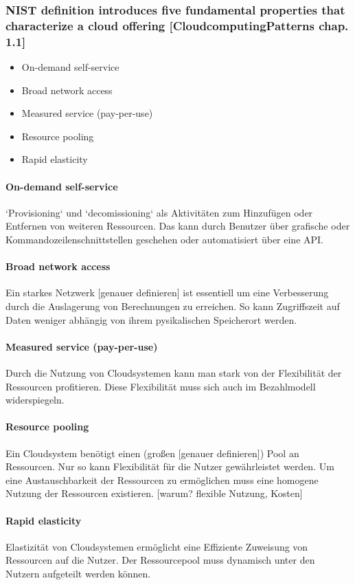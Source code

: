 \documentclass[a4paper,10pt]{article}
\begin{document}
\subsubsection{NIST definition introduces five fundamental properties that characterize a cloud offering [CloudcomputingPatterns chap. 1.1]}

\begin{itemize}
 \item On-demand self-service
 \item Broad network access
 \item Measured service (pay-per-use)
 \item Resource pooling
 \item Rapid elasticity
\end{itemize}

\paragraph{On-demand self-service}
`Provisioning` und `decomissioning` als Aktivitäten zum Hinzufügen oder Entfernen von weiteren Ressourcen.
Das kann durch Benutzer über grafische oder Kommandozeilenschnittstellen geschehen oder automatisiert über eine API.
\paragraph{Broad network access}
Ein starkes Netzwerk [genauer definieren] ist essentiell um eine Verbesserung durch die Auslagerung von Berechnungen zu erreichen. 
So kann Zugriffszeit auf Daten weniger abhängig von ihrem pysikalischen Speicherort werden.
\paragraph{Measured service (pay-per-use)}
Durch die Nutzung von Cloudsystemen kann man stark von der Flexibilität der Ressourcen profitieren.
Diese Flexibilität muss sich auch im Bezahlmodell widerspiegeln.
\paragraph{Resource pooling}
Ein Cloudsystem benötigt einen (großen [genauer definieren]) Pool an Ressourcen.
Nur so kann Flexibilität für die Nutzer gewährleistet werden.
Um eine Austauschbarkeit der Ressourcen zu ermöglichen muss eine homogene Nutzung der Ressourcen existieren. [warum? flexible Nutzung, Kosten]
\paragraph{Rapid elasticity}
Elastizität von Cloudsystemen ermöglicht eine Effiziente Zuweisung von Ressourcen auf die Nutzer.
Der Ressourcepool muss dynamisch unter den Nutzern aufgeteilt werden können.
\end{document}
